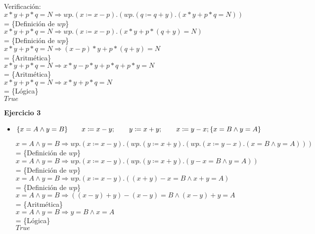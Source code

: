 \documentclass[12pt]{article}
\begin{document}
\begin{itemize}
    Verificación:\\
    $x * y + p * q = N \Rightarrow wp.(x \coloneqq x - p).(wp.(q \coloneqq q + y).(x * y + p * q = N))$\\
    = \{Definición de $wp$\}\\
    $x * y + p * q = N \Rightarrow wp.(x \coloneqq x - p).(x * y + p * (q + y) = N)$\\
    = \{Definición de $wp$\}\\
    $x * y + p * q = N \Rightarrow (x - p) * y + p * (q + y) = N$\\
    = \{Aritmética\}\\
    $x * y + p * q = N \Rightarrow x * y - p * y + p * q + p * y = N$\\
    = \{Aritmética\}\\
    $x * y + p * q = N \Rightarrow x * y + p * q = N$\\
    = \{Lógica\}\\
    $True$

\end{itemize}

\textbf{Ejercicio 3}

\begin{itemize}
    \item $\{x = A \land y = B\}\\
            \hspace*{20pt}x \coloneqq x - y;\\
            \hspace*{20pt}y \coloneqq x + y;\\
            \hspace*{20pt}x \coloneqq y - x;\\
            \{x = B \land y = A\}$

    \bigbreak

    $x = A \land y = B \Rightarrow wp.(x \coloneqq x - y).(wp.(y \coloneqq x + y).(wp.(x \coloneqq y - x).(x = B \land y = A)))$\\
    = \{Definición de $wp$\}\\
    $x = A \land y = B \Rightarrow wp.(x \coloneqq x - y).(wp.(y \coloneqq x + y).(y - x = B \land y = A))$\\
    = \{Definición de $wp$\}\\
    $x = A \land y = B \Rightarrow wp.(x \coloneqq x - y).((x + y) - x = B \land x + y = A)$\\
    = \{Definición de $wp$\}\\
    $x = A \land y = B \Rightarrow ((x - y) + y) - (x - y) = B \land (x - y) + y = A$\\
    = \{Aritmética\}\\
    $x = A \land y = B \Rightarrow y = B \land x = A$\\
    = \{Lógica\}\\
    $True$

\end{itemize}
\end{document}
